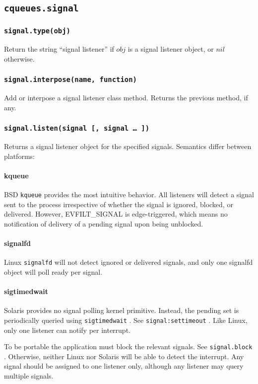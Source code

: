 \documentclass[11pt, oneside]{memoir}
\newcommand{\syscall}[1]{\texttt{#1} }
\newcommand{\routine}[1]{\texttt{#1} }
\newcommand{\fn}[1]{\texttt{#1} }
\newcommand{\method}[1]{\texttt{#1} }
\newcounter{toccols}
\newenvironment{Module}[1]{
	\subsection{\texttt{#1}}
	\addtocontents{toc}{
		\protect\begin{multicols}{\value{toccols}}
	}
}{
	\addtocontents{toc}{\protect\end{multicols}}
}
\begin{document}
\begin{Module}{cqueues.signal}
\subsubsection[\routine{signal.type}]{\routine{signal.type(obj)}}
Return the string ``signal listener'' if $obj$ is a signal listener object, or $nil$ otherwise.

\subsubsection[\fn{signal.interpose}]{\fn{signal.interpose(name, function)}}
Add or interpose a signal listener class method. Returns the previous method, if any.

\subsubsection[\fn{signal.listen}]{\fn{signal.listen(signal [, signal … ])}}
Returns a signal listener object for the specified signals. Semantics differ between platforms:

\paragraph{kqueue}
BSD \syscall{kqueue} provides the most intuitive behavior. All listeners will detect a signal sent to the process irrespective of whether the signal is ignored, blocked, or delivered. However, EVFILT\_SIGNAL is edge-triggered, which means no notification of delivery of a pending signal upon being unblocked.

\paragraph{signalfd}
Linux \syscall{signalfd} will not detect ignored or delivered signals, and only one signalfd object will poll ready per signal.

\paragraph{sigtimedwait}
Solaris provides no signal polling kernel primitive. Instead, the pending set is periodically queried using \syscall{sigtimedwait}. See \method{signal:settimeout}. Like Linux, only one listener can notify per interrupt.

To be portable the application must block the relevant signals. See \fn{signal.block}. Otherwise, neither Linux nor Solaris will be able to detect the interrupt. Any signal should be assigned to one listener only, although any listener may query multiple signals.


\end{Module}
\end{document}
